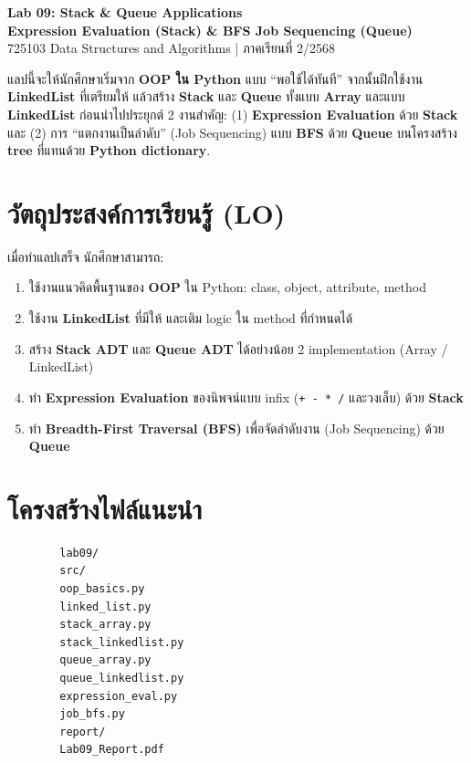 \documentclass[12pt,a4paper]{article}
\newcommand{\code}[1]{\texttt{#1}}
\begin{document}
	
	\begin{center}
		{\Large \textbf{Lab 09: Stack \& Queue Applications}}\\
		\vspace{0.15em}
		{\normalsize \textbf{Expression Evaluation (Stack) \& BFS Job Sequencing (Queue)}}\\
		\vspace{0.35em}
		{\normalsize 725103 Data Structures and Algorithms \quad | \quad ภาคเรียนที่ 2/2568}
	\end{center}
	
	\vspace{0.5em}
	แลปนี้จะให้นักศึกษาเริ่มจาก \textbf{OOP ใน Python} แบบ “พอใช้ได้ทันที” จากนั้นฝึกใช้งาน \textbf{LinkedList} ที่เตรียมให้
	แล้วสร้าง \textbf{Stack} และ \textbf{Queue} ทั้งแบบ \textbf{Array} และแบบ \textbf{LinkedList}
	ก่อนนำไปประยุกต์ 2 งานสำคัญ:
	(1) \textbf{Expression Evaluation} ด้วย \textbf{Stack}
	และ (2) การ “แตกงานเป็นลำดับ” (Job Sequencing) แบบ \textbf{BFS} ด้วย \textbf{Queue}
	บนโครงสร้าง \textbf{tree} ที่แทนด้วย \textbf{Python dictionary}.
	
	\section*{วัตถุประสงค์การเรียนรู้ (LO)}
	เมื่อทำแลปเสร็จ นักศึกษาสามารถ:
	\begin{enumerate}[label=\arabic*.]
		\item ใช้งานแนวคิดพื้นฐานของ \textbf{OOP} ใน Python: class, object, attribute, method
		\item ใช้งาน \textbf{LinkedList} ที่มีให้ และเติม logic ใน method ที่กำหนดได้
		\item สร้าง \textbf{Stack ADT} และ \textbf{Queue ADT} ได้อย่างน้อย 2 implementation (Array / LinkedList)
		\item ทำ \textbf{Expression Evaluation} ของนิพจน์แบบ infix (\code{+ - * /} และวงเล็บ) ด้วย \textbf{Stack}
		\item ทำ \textbf{Breadth-First Traversal (BFS)} เพื่อจัดลำดับงาน (Job Sequencing) ด้วย \textbf{Queue}
	\end{enumerate}
	
	
	\section*{โครงสร้างไฟล์แนะนำ}
	\begin{verbatim}
		lab09/
		src/
		oop_basics.py
		linked_list.py
		stack_array.py
		stack_linkedlist.py
		queue_array.py
		queue_linkedlist.py
		expression_eval.py
		job_bfs.py
		report/
		Lab09_Report.pdf
	\end{verbatim}
	
\end{document}
